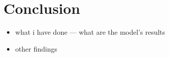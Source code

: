 \chapter*{Conclusion}

\begin{itemize}
    \item what i have done --- what are the model's results
    \item other findings
\end{itemize}
